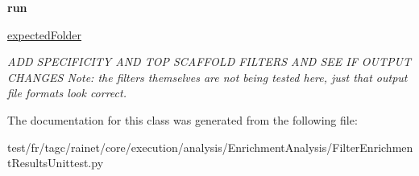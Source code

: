 \begin{DoxyCompactItemize}
\item 
\hypertarget{classFilterEnrichmentResultsUnittest_1_1FilterEnrichmentResultsUnittest_ab03839f2c2769127d18c1325b3472756}{{\bfseries run}}\label{classFilterEnrichmentResultsUnittest_1_1FilterEnrichmentResultsUnittest_ab03839f2c2769127d18c1325b3472756}

\item 
\hypertarget{classFilterEnrichmentResultsUnittest_1_1FilterEnrichmentResultsUnittest_aa721ee8d4420c54f8c8b2bdeb58addf3}{\hyperlink{classFilterEnrichmentResultsUnittest_1_1FilterEnrichmentResultsUnittest_aa721ee8d4420c54f8c8b2bdeb58addf3}{expected\-Folder}}\label{classFilterEnrichmentResultsUnittest_1_1FilterEnrichmentResultsUnittest_aa721ee8d4420c54f8c8b2bdeb58addf3}

\begin{DoxyCompactList}\small\item\em A\-D\-D S\-P\-E\-C\-I\-F\-I\-C\-I\-T\-Y A\-N\-D T\-O\-P S\-C\-A\-F\-F\-O\-L\-D F\-I\-L\-T\-E\-R\-S A\-N\-D S\-E\-E I\-F O\-U\-T\-P\-U\-T C\-H\-A\-N\-G\-E\-S Note\-: the filters themselves are not being tested here, just that output file formats look correct. \end{DoxyCompactList}\end{DoxyCompactItemize}


The documentation for this class was generated from the following file\-:\begin{DoxyCompactItemize}
\item 
test/fr/tagc/rainet/core/execution/analysis/\-Enrichment\-Analysis/Filter\-Enrichment\-Results\-Unittest.\-py\end{DoxyCompactItemize}
